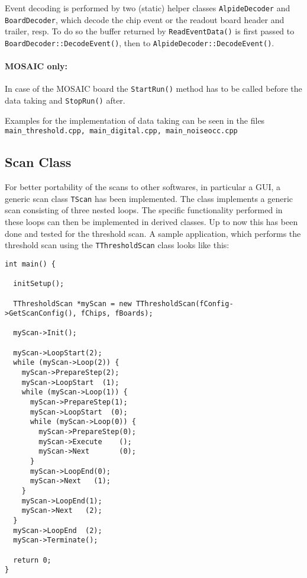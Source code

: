 \documentclass{article}
\begin{document}
Event decoding is performed by two (static) helper classes
\texttt{AlpideDecoder} and \texttt{BoardDecoder}, which decode the chip
event or the readout board header and trailer, resp. To do so the
buffer returned by \texttt{ReadEventData()} is first passed to
\texttt{BoardDecoder::DecodeEvent()}, then to
\texttt{AlpideDecoder::DecodeEvent()}. 



\paragraph{MOSAIC only:} In case of the MOSAIC board the \texttt{StartRun()} method has to be called before the data taking and \texttt{StopRun()} after.

Examples for the implementation of data taking can be seen in the files \texttt{main\_threshold.cpp, main\_digital.cpp, main\_noiseocc.cpp}



\subsection {Scan Class} 
For better portability of the scans to other softwares, in particular a GUI, a generic scan class \texttt{TScan} has been implemented. The class implements a generic scan consisting of three nested loops. The specific functionality performed in these loops can then be implemented in derived classes. Up to now this has been done and tested for the threshold scan. A sample application, which performs the threshold scan using the \texttt{TThresholdScan} class looks like this: 

\begin {lstlisting}
int main() {

  initSetup();

  TThresholdScan *myScan = new TThresholdScan(fConfig->GetScanConfig(), fChips, fBoards);

  myScan->Init();

  myScan->LoopStart(2);
  while (myScan->Loop(2)) {
    myScan->PrepareStep(2);
    myScan->LoopStart  (1);
    while (myScan->Loop(1)) {
      myScan->PrepareStep(1);
      myScan->LoopStart  (0);
      while (myScan->Loop(0)) {
        myScan->PrepareStep(0);
        myScan->Execute    ();
        myScan->Next       (0);  
      }
      myScan->LoopEnd(0);
      myScan->Next   (1);
    }
    myScan->LoopEnd(1);
    myScan->Next   (2);
  }
  myScan->LoopEnd  (2);
  myScan->Terminate();
  
  return 0;
}
\end{lstlisting}
\end{document}
